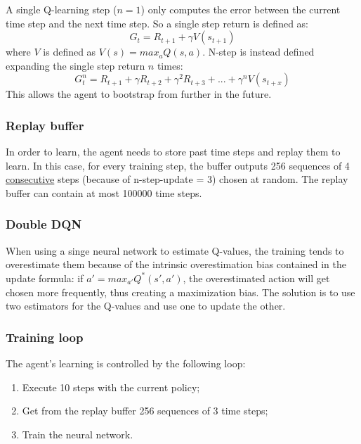 \documentclass{article}
\begin{document}
A single Q-learning step ($n=1$) only computes the error between the current time step and the next time step.
So a single step return is defined as:
\begin{equation}
    G_t=R_{t+1}+\gamma V(s_{t+1})
\end{equation}
where $V$ is defined as $V(s)=max_aQ(s, a)$.
N-step is instead defined expanding the single step return $n$ times:
\begin{equation}
    G_t^n=R_{t+1}+\gamma R_{t+2}+\gamma^2R_{t+3}+...+\gamma^nV(s_{t+x})
\end{equation}
This allows the agent to bootstrap from further in the future.

\subsubsection{Replay buffer}

In order to learn, the agent needs to store past time steps and replay them to learn.
In this case, for every training step, the buffer outputs 256 sequences of 4 \underline{consecutive} steps (because of n-step-update = 3) chosen at random.
The replay buffer can contain at most 100000 time steps.

\subsubsection{Double DQN}

When using a singe neural network to estimate Q-values, the training tends to overestimate them because of the intrinsic overestimation bias contained in the update formula: if $a'=max_{a'}Q^*(s',a')$, the overestimated action will get chosen more frequently, thus creating a maximization bias.
The solution is to use two estimators for the Q-values and use one to update the other\cite{doubleDQNpaper}.

\subsubsection{Training loop}

The agent's learning is controlled by the following loop:
\begin{enumerate}
    \item Execute 10 steps with the current policy;
    \item Get from the replay buffer 256 sequences of 3 time steps;
    \item Train the neural network.
\end{enumerate}
\end{document}
